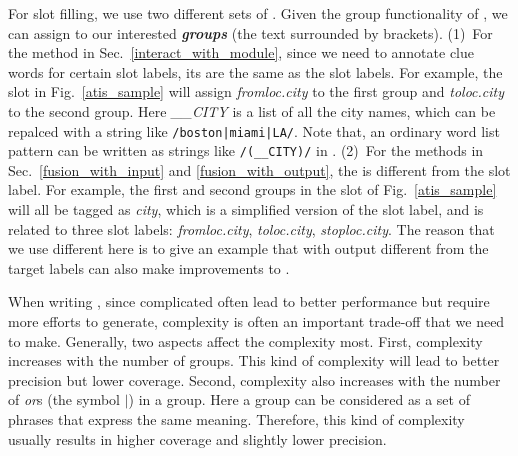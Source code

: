 For slot filling, we use two different sets of \REs. Given the group functionality of \RE, we can assign \REtags to our interested
\textbf{\emph{\RE groups}} (the text surrounded by brackets). (1)~For the method in Sec.~\ref{interact_with_module}, since we need to
annotate clue words for certain slot labels, its \REtags are the same as the slot labels.
For example, the slot \RE in Fig.~\ref{atis_sample} will assign \emph{fromloc.city} to the first \RE group and \emph{toloc.city} to the second group.
Here \emph{\_\_CITY} is a list of
all the city names, which can be repalced with a string like \texttt{/boston|miami|LA/}. Note that, an ordinary word list pattern can be
written as strings like \texttt{/(\_\_CITY)/} in \RE. (2)~For the methods in Sec.~\ref{fusion_with_input} and \ref{fusion_with_output}, the
\REtag is different from the slot label.
For example, the first and second \RE groups in the slot \RE of Fig.~\ref{atis_sample} will all be tagged as \emph{city},
which is a simplified version of the slot label, and is related to three slot labels: \emph{fromloc.city}, \emph{toloc.city}, \emph{stoploc.city}.
The reason that we use different \REs here is to give an example that \REs
with output different from the target labels can also make improvements to \NN.


When writing \REs, since complicated \REs often lead to better performance but require more efforts to generate, \RE complexity is often an important trade-off that we need to make. Generally, two aspects affect the complexity most. First, \RE complexity increases with the number of \RE groups. This kind of complexity will lead to better precision but lower coverage. Second, \RE complexity also increases with the number of \emph{or}s (the symbol $|$) in a \RE group. Here a group can be considered as a set of phrases that express the same meaning. Therefore, this kind of complexity usually results in higher coverage and slightly lower precision.

